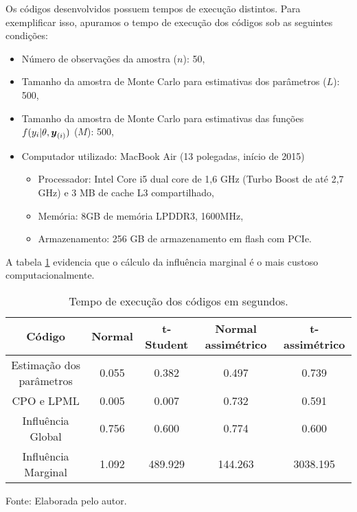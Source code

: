 Os códigos desenvolvidos possuem tempos de execução distintos. Para exemplificar isso, apuramos o tempo de execução dos códigos sob as seguintes condições:
\begin{itemize}
\item Número de observações da amostra ($n$): 50,
\item Tamanho da amostra de Monte Carlo para estimativas dos parâmetros ($L$): 500,
\item Tamanho da amostra de Monte Carlo para estimativas das funções $f(y_i|\theta,{\boldsymbol{y}_{(i)}})$ ($M$): 500,
\item Computador utilizado: MacBook Air (13 polegadas, início de 2015)
\begin{itemize}
\item Processador: Intel Core i5 dual core de 1,6 GHz (Turbo Boost de até 2,7 GHz) e 3 MB de cache L3 compartilhado,
\item Memória: 8GB de memória LPDDR3, 1600MHz,
\item Armazenamento: 256 GB de armazenamento em flash com PCIe.
\end{itemize}
\end{itemize}
A tabela \ref{tab:appendix_tempo_rodada} evidencia que o cálculo da influência marginal é o mais custoso computacionalmente.

\begin{table}[h] 
\centering
\caption{Tempo de execução dos códigos em segundos.}
\label{tab:appendix_tempo_rodada}
\begin{tabular}{ccccc}
\hline
Código                         & Normal &t-Student &Normal assimétrico &t-assimétrico \\
\hline
Estimação dos parâmetros  &0.055  &   0.382  &            0.497  &       0.739 \\
CPO e LPML                &0.005  &   0.007  &            0.732  &       0.591 \\
Influência Global         &0.756  &   0.600  &            0.774  &       0.600 \\
Influência Marginal       &1.092  & 489.929  &          144.263  &    3038.195 \\
\hline
\end{tabular}

Fonte:  Elaborada pelo autor.
\end{table}




